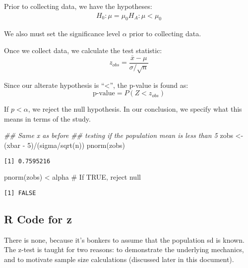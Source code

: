 \documentclass[
  letterpaper,
  DIV=11,
  numbers=noendperiod]{scrreprt}
\newenvironment{Shaded}{\begin{snugshade}}{\end{snugshade}}
\newcommand{\CommentTok}[1]{\textcolor[rgb]{0.37,0.37,0.37}{#1}}
\newcommand{\DecValTok}[1]{\textcolor[rgb]{0.68,0.00,0.00}{#1}}
\newcommand{\DocumentationTok}[1]{\textcolor[rgb]{0.37,0.37,0.37}{\textit{#1}}}
\newcommand{\FunctionTok}[1]{\textcolor[rgb]{0.28,0.35,0.67}{#1}}
\newcommand{\NormalTok}[1]{\textcolor[rgb]{0.00,0.23,0.31}{#1}}
\newcommand{\OtherTok}[1]{\textcolor[rgb]{0.00,0.23,0.31}{#1}}
\newcommand{\SpecialCharTok}[1]{\textcolor[rgb]{0.37,0.37,0.37}{#1}}
\begin{document}
Prior to collecting data, we have the hypotheses: \begin{align*}
H_0:\mu = \mu_0
H_A: \mu < \mu_0
\end{align*}

We also must set the significance level \(\alpha\) prior to collecting
data.

Once we collect data, we calculate the test statistic: \[
z_{obs} = \frac{\bar x - \mu}{\sigma/\sqrt{n}}
\]

Since our alterate hypothesis is ``\textless{}'', the p-value is found
as: \[
\text{p-value} = P(Z < z_{obs})
\]

If \(p < \alpha\), we reject the null hypothesis. In our conclusion, we
specify what this means in terms of the study.

\begin{Shaded}
\begin{Highlighting}[]
\DocumentationTok{\#\# Same x as before}
\DocumentationTok{\#\# testing if the population mean is less than 5}
\NormalTok{zobs }\OtherTok{\textless{}{-}}\NormalTok{ (xbar }\SpecialCharTok{{-}} \DecValTok{5}\NormalTok{)}\SpecialCharTok{/}\NormalTok{(sigma}\SpecialCharTok{/}\FunctionTok{sqrt}\NormalTok{(n))}
\FunctionTok{pnorm}\NormalTok{(zobs)}
\end{Highlighting}
\end{Shaded}

\begin{verbatim}
[1] 0.7595216
\end{verbatim}

\begin{Shaded}
\begin{Highlighting}[]
\FunctionTok{pnorm}\NormalTok{(zobs) }\SpecialCharTok{\textless{}}\NormalTok{ alpha }\CommentTok{\# If TRUE, reject null}
\end{Highlighting}
\end{Shaded}

\begin{verbatim}
[1] FALSE
\end{verbatim}

\hypertarget{r-code-for-z}{%
\subsection{R Code for z}\label{r-code-for-z}}

There is none, because it's bonkers to assume that the population sd is
known. The z-test is taught for two reasons: to demonstrate the
underlying mechanics, and to motivate sample size calculations
(discussed later in this document).
\end{document}
